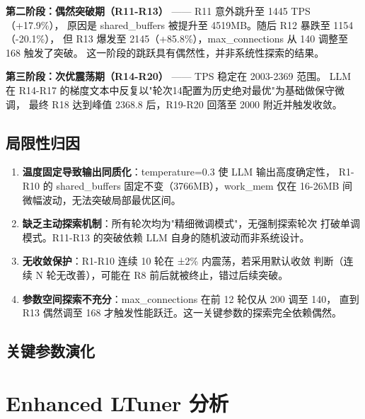 \textbf{第二阶段：偶然突破期（R11-R13）} —— R11 意外跳升至 1445 TPS（+17.9\%），
原因是 shared\_buffers 被提升至 4519MB。随后 R12 暴跌至 1154（-20.1\%），
但 R13 爆发至 2145（+85.8\%），max\_connections 从 140 调整至 168 触发了突破。
这一阶段的跳跃具有偶然性，并非系统性探索的结果。

\textbf{第三阶段：次优震荡期（R14-R20）} —— TPS 稳定在 2003-2369 范围。
LLM 在 R14-R17 的梯度文本中反复以"轮次14配置为历史绝对最优"为基础做保守微调，
最终 R18 达到峰值 2368.8 后，R19-R20 回落至 2000 附近并触发收敛。

\subsection{局限性归因}

\begin{enumerate}
  \item \textbf{温度固定导致输出同质化}：temperature=0.3 使 LLM 输出高度确定性，
        R1-R10 的 shared\_buffers 固定不变（3766MB），work\_mem 仅在 16-26MB 间
        微幅波动，无法突破局部最优区间。
  \item \textbf{缺乏主动探索机制}：所有轮次均为"精细微调模式"，无强制探索轮次
        打破单调模式。R11-R13 的突破依赖 LLM 自身的随机波动而非系统设计。
  \item \textbf{无收敛保护}：R1-R10 连续 10 轮在 ±2\% 内震荡，若采用默认收敛
        判断（连续 N 轮无改善），可能在 R8 前后就被终止，错过后续突破。
  \item \textbf{参数空间探索不充分}：max\_connections 在前 12 轮仅从 200 调至 140，
        直到 R13 偶然调至 168 才触发性能跃迁。这一关键参数的探索完全依赖偶然。
\end{enumerate}

\subsection{关键参数演化}




\section{Enhanced LTuner 分析}

